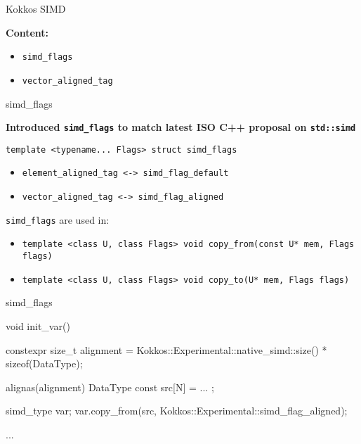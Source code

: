 

\begin{frame}[fragile]

  {\Huge Kokkos SIMD}

  \vspace{10pt}

  \textbf{Content:}
	\begin{itemize}
		\item \texttt{simd\_flags}
		\item \texttt{vector\_aligned\_tag}
	\end{itemize}

\end{frame}


\begin{frame}[fragile]{simd\_flags}

\textbf{Introduced \texttt{simd\_flags} to match latest ISO C++ proposal on \texttt{std::simd}}

\vspace{10pt}

\texttt{template <typename... Flags> struct simd\_flags}

\vspace{10pt}

\begin{itemize}
	\item \texttt{element\_aligned\_tag <-> simd\_flag\_default}
	\item \texttt{vector\_aligned\_tag <-> simd\_flag\_aligned}
\end{itemize}

\vspace{10pt}
\texttt{simd\_flags} are used in:
\begin{itemize}
  \item \texttt{template <class U, class Flags> void copy\_from(const U* mem, Flags flags)}
  \item \texttt{template <class U, class Flags> void copy\_to(U* mem, Flags flags)}
\end{itemize}

\end{frame}


\begin{frame}[fragile]{simd\_flags}

\begin{code}[keywords={simd_flags}]
void init_var() {
  constexpr size_t alignment =
    Kokkos::Experimental::native_simd::size() * sizeof(DataType);

  alignas(alignment) DataType const src[N] = { ... };

  simd_type var;
  var.copy_from(src, Kokkos::Experimental::simd_flag_aligned);

  ...
}
\end{code}

\end{frame}

